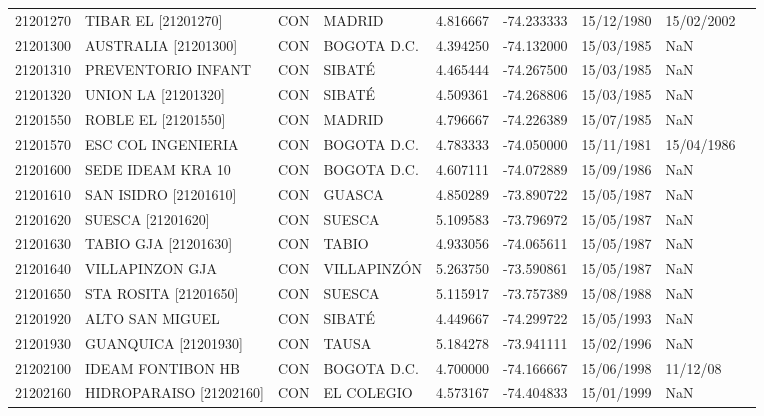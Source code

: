 \begin{landscape}
\begin{longtable}{lp{4cm}lp{3cm}lrrll}
   21201270 &         TIBAR EL [21201270] &  CON &            MADRID &  4.816667 & -74.233333 &  15/12/1980 &  15/02/2002 \\
   21201300 &        AUSTRALIA [21201300] &  CON &       BOGOTA D.C. &  4.394250 & -74.132000 &  15/03/1985 &         NaN \\
   21201310 &          PREVENTORIO INFANT &  CON &            SIBATÉ &  4.465444 & -74.267500 &  15/03/1985 &         NaN \\
   21201320 &         UNION LA [21201320] &  CON &            SIBATÉ &  4.509361 & -74.268806 &  15/03/1985 &         NaN \\
   21201550 &         ROBLE EL [21201550] &  CON &            MADRID &  4.796667 & -74.226389 &  15/07/1985 &         NaN \\
   21201570 &          ESC COL INGENIERIA &  CON &       BOGOTA D.C. &  4.783333 & -74.050000 &  15/11/1981 &  15/04/1986 \\
   21201600 &           SEDE IDEAM KRA 10 &  CON &       BOGOTA D.C. &  4.607111 & -74.072889 &  15/09/1986 &         NaN \\
   21201610 &       SAN ISIDRO [21201610] &  CON &            GUASCA &  4.850289 & -73.890722 &  15/05/1987 &         NaN \\
   21201620 &        SUESCA    [21201620] &  CON &            SUESCA &  5.109583 & -73.796972 &  15/05/1987 &         NaN \\
   21201630 &        TABIO GJA [21201630] &  CON &             TABIO &  4.933056 & -74.065611 &  15/05/1987 &         NaN \\
   21201640 &             VILLAPINZON GJA &  CON &       VILLAPINZÓN &  5.263750 & -73.590861 &  15/05/1987 &         NaN \\
   21201650 &       STA ROSITA [21201650] &  CON &            SUESCA &  5.115917 & -73.757389 &  15/08/1988 &         NaN \\
   21201920 &             ALTO SAN MIGUEL &  CON &            SIBATÉ &  4.449667 & -74.299722 &  15/05/1993 &         NaN \\
   21201930 &        GUANQUICA [21201930] &  CON &             TAUSA &  5.184278 & -73.941111 &  15/02/1996 &         NaN \\
   21202100 &           IDEAM FONTIBON HB &  CON &       BOGOTA D.C. &  4.700000 & -74.166667 &  15/06/1998 &    11/12/08 \\
   21202160 &     HIDROPARAISO [21202160] &  CON &        EL COLEGIO &  4.573167 & -74.404833 &  15/01/1999 &         NaN \\

\end{longtable}
\end{landscape}
